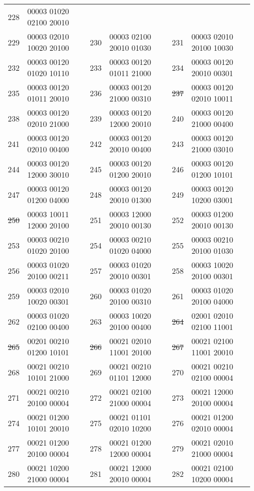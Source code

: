 \begin{tabular}{|l|l||l|l||l|l|}
{228} &00003 01020 02100 20010 \\
{229} &00003 02010 10020 20100 &
{230} &00003 02100 20010 01030 &
{231} &00003 02010 20100 10030 \\
{232} &00003 00120 01020 10110 &
{233} &00003 00120 01011 21000 &
{234} &00003 00120 20010 00301 \\
{235} &00003 00120 01011 20010 &
{236} &00003 00120 21000 00310 &
\sout{237} &00003 00120 02010 10011 \\
{238} &00003 00120 02010 21000 &
{239} &00003 00120 12000 20010 &
{240} &00003 00120 21000 00400 \\
{241} &00003 00120 02010 00400 &
{242} &00003 00120 20010 00400 &
{243} &00003 00120 21000 03010 \\
{244} &00003 00120 12000 30010 &
{245} &00003 00120 01200 20010 &
{246} &00003 00120 01200 10101 \\
{247} &00003 00120 01200 04000 &
{248} &00003 00120 20010 01300 &
{249} &00003 00120 10200 03001 \\
\sout{250} &00003 10011 12000 20100 &
{251} &00003 12000 20010 00130 &
{252} &00003 01200 20010 00130 \\
{253} &00003 00210 01020 20100 &
{254} &00003 00210 01020 04000 &
{255} &00003 00210 20100 01030 \\
{256} &00003 01020 20100 00211 &
{257} &00003 01020 20010 00301 &
{258} &00003 10020 20100 00301 \\
{259} &00003 02010 10020 00301 &
{260} &00003 01020 20100 00310 &
{261} &00003 01020 20100 04000 \\
{262} &00003 01020 02100 00400 &
{263} &00003 10020 20100 00400 &
\sout{264} &02001 02010 02100 11001 \\
\sout{265} &00201 00210 01200 10101 &
\sout{266} &00021 02010 11001 20100 &
\sout{267} &00021 02100 11001 20010 \\
{268} &00021 00210 10101 21000 &
{269} &00021 00210 01101 12000 &
{270} &00021 00210 02100 00004 \\
{271} &00021 00210 20100 00004 &
{272} &00021 02100 21000 00004 &
{273} &00021 12000 20100 00004 \\
{274} &00021 01200 10101 20010 &
{275} &00021 01101 02010 10200 &
{276} &00021 01200 02010 00004 \\
{277} &00021 01200 20100 00004 &
{278} &00021 01200 12000 00004 &
{279} &00021 02010 21000 00004 \\
{280} &00021 10200 21000 00004 &
{281} &00021 12000 20010 00004 &
{282} &00021 02100 10200 00004 \\

\end{tabular}
